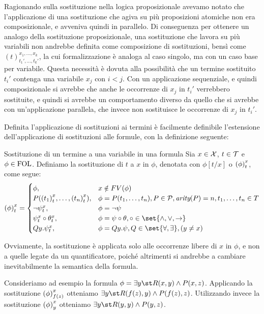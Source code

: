 Ragionando sulla sostituzione nella logica proposizionale avevamo notato che l'applicazione di una sostituzione che agiva su più proposizioni atomiche non era composizionale, e avveniva quindi in parallelo. Di conseguenza per ottenere un analogo della sostituzione proposizionale, una sostituzione che lavora su più variabili non andrebbe definita come composizione di sostituzioni, bensì come \({(t)}^{x_1,\ldots,x_k}_{t_1',\ldots,t_k'}\), la cui formalizzazione è analoga al caso singolo, ma con un caso base per variabile. Questa necessità è dovuta alla possibilità che un termine sostituito \(t_i'\) contenga una variabile \(x_j\) con \(i<j\). Con un applicazione sequenziale, e quindi composizionale si avrebbe che anche le occorrenze di \(x_j\) in \(t_i'\) verrebbero sostituite, e quindi si avrebbe un comportamento diverso da quello che si avrebbe con un'applicazione parallela, che invece non sostituisce le occorrenze di \(x_j\) in \(t_i'\).

Definita l'applicazione di sostituzioni ai termini è facilmente definibile l'estensione dell'applicazione di sostituzioni alle formule, con la definizione seguente:

\begin{definition}{Sostituzione di un termine a una variabile in una formula}
  Sia \(x\in\mathcal{X}\), \(t\in\mathcal{T}\) e \(\phi\in\FOL\). Definiamo la sostituzione di \(t\) a \(x\) in \(\phi\), denotata con \(\phi[t/x]\) o \({{\left(\phi\right)}^{x}_{t}}\), come segue:
  \[\subs{\phi}{x}{t} = \begin{cases}
    \phi, & x \notin FV(\phi)\\
    P({(t_1)}^x_{t}, \ldots, {(t_n)}^x_{t}), & \phi = P(t_1,\ldots,t_n), P\in\PredSyms, \arty(P)=n, t_1,\ldots,t_n \in T\\
    \neg {\psi}^x_{t}, & \phi = \neg \psi\\
    {\psi}^x_{t}\circ{\theta}^x_{t}, & \phi = \psi\circ\theta, \circ\in\set{\land,\lor,\to}\\
    Q y. {\psi}^x_{t}, & \phi = Q y. \psi, Q\in\set{\forall,\exists}, (y\neq x)
  \end{cases}\]
\end{definition}

Ovviamente, la sostituzione è applicata solo alle occorrenze libere di \(x\) in \(\phi\), e non a quelle legate da un quantificatore, poiché altrimenti si andrebbe a cambiare inevitabilmente la semantica della formula.

Consideriamo ad esempio la formula \(\phi = \exists y\st R(x,y) \land P(x,z)\). Applicando la sostituzione \({{\left(\phi\right)}^{x}_{f(z)}}\) otteniamo \(\exists y\st R(f(z),y) \land P(f(z),z)\).
Utilizzando invece la sostituzione \({{\left(\phi\right)}^{x}_{y}}\) otteniamo \(\exists y\st R(y,y) \land P(y,z)\).

